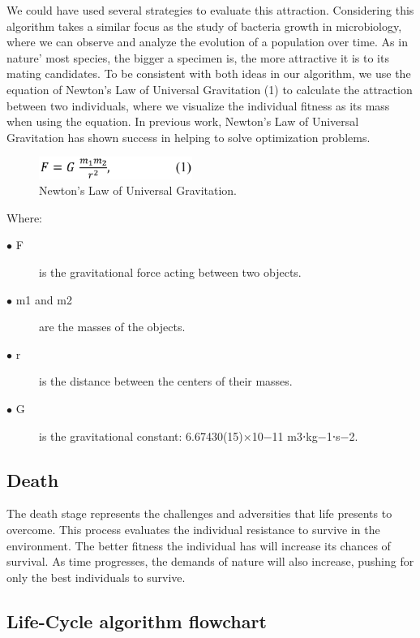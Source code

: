\documentclass[runningheads]{llncs}
\begin{document}
We could have used several strategies to evaluate this attraction. Considering
this algorithm takes a similar focus as the study of bacteria growth in
microbiology, where we can observe and analyze the evolution of a population
over time. As in nature' most species, the bigger a specimen is, the more
attractive it is to its mating candidates. To be consistent with both ideas in
our algorithm, we use the equation of Newton's Law of Universal Gravitation (1)
to calculate the attraction between two individuals, where we visualize the
individual fitness as its mass when using the equation. In previous work,
Newton's Law of Universal Gravitation has shown success in helping to solve
optimization problems.

\begin{figure}
    \centering
    \includegraphics[width=50mm]{img/fig3_newtonslaw.pdf}
    \caption{Newton's Law of Universal Gravitation.} \label{fig3}
    \end{figure}

Where:
\begin{description}  %
    \item[$\bullet$ F] is the gravitational force acting between two objects.
    \item[$\bullet$ m1 and m2] are the masses of the objects.
    \item[$\bullet$ r]	is the distance between the centers of their masses.
    \item[$\bullet$ G]	is the gravitational constant: 6.67430(15)×10−11 m3⋅kg−1⋅s−2.
\end{description}


\subsection{Death}

The death stage represents the challenges and adversities that life presents to
overcome. This process evaluates the individual resistance to survive in the
environment. The better fitness the individual has will increase its chances of
survival. As time progresses, the demands of nature will also increase, pushing
for only the best individuals to survive.

\subsection{Life-Cycle algorithm flowchart}
\end{document}
